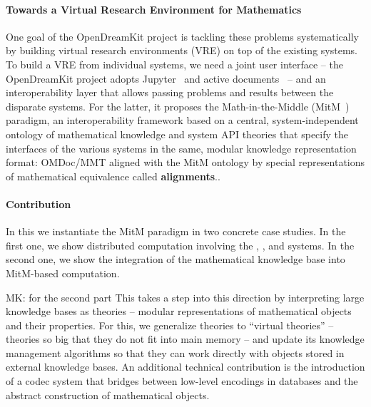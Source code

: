 
\paragraph{Towards a Virtual Research Environment for Mathematics} One goal of the OpenDreamKit project is tackling these problems systematically by building virtual research environments (VRE) on top of the existing systems.  To build a VRE from individual systems, we need a joint user interface -- the OpenDreamKit project adopts Jupyter~\cite{jupyter-project:on} and active documents~\cite{KohDavGin:psewads11} -- and an interoperability layer that allows passing problems and results between the disparate systems.  For the latter, it proposes the Math-in-the-Middle (MitM~\cite{DehKohKon:iop16}) paradigm, an interoperability framework based on a central, system-independent ontology of mathematical knowledge and system API theories that specify the interfaces of the various systems in the same, modular knowledge representation format: OMDoc/MMT aligned with the MitM ontology by special representations of mathematical equivalence called \textbf{alignments}..

\paragraph{Contribution}
In this \papertype we instantiate the MitM paradigm in two concrete case studies.
In the first one, we show distributed computation involving the \GAP, \Sage, and \Singular systems.
In the second one, we show the integration of the mathematical knowledge base \LMFDB into MitM-based computation.

\begin{newpart}{MK: for the second part}
    This \papertype takes a step into this direction by interpreting large knowledge bases as \ommt theories -- modular representations of mathematical objects and their properties. 
  For this, we generalize \ommt theories to ``virtual theories'' -- theories so big that they do not fit into main memory -- and update its knowledge management algorithms so that they can work directly with objects stored in external knowledge bases.
  An additional technical contribution is the introduction of a codec system that bridges between low-level encodings in databases and the abstract construction of mathematical objects.
\end{newpart}

